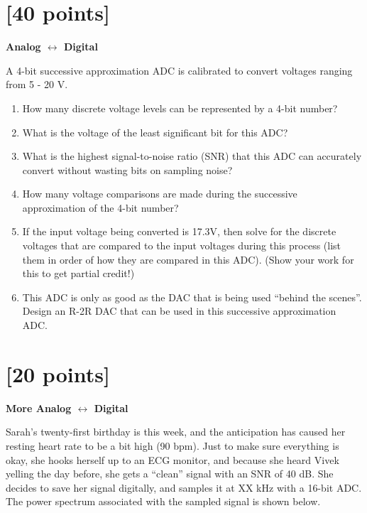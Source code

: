 \documentclass[12pt]{article}
\begin{document}
\clearpage



\clearpage



\clearpage



\section{[40 points]}

{\bf Analog $\leftrightarrow$ Digital}

A 4-bit successive approximation ADC is calibrated to convert voltages ranging from 5 - 20 V.

\begin{enumerate}
\item How many discrete voltage levels can be represented by a 4-bit number?
\item What is the voltage of the least significant bit for this ADC?
\item What is the highest signal-to-noise ratio (SNR) that this ADC can
accurately convert without wasting bits on sampling noise?
\item How many voltage comparisons are made during the successive approximation
of the 4-bit number?
\item If the input voltage being converted is 17.3V, then solve for the
discrete voltages that are compared to the input voltages during this process
(list them in order of how they are compared in this ADC).  (Show your work for
this to get partial credit!)
\item This ADC is only as good as the DAC that is being used ``behind the
scenes''.  Design an R-2R DAC that can be used in this successive approximation
ADC.
\end{enumerate}

\clearpage



\clearpage



\clearpage



\section{[20 points]}

{\bf More Analog $\leftrightarrow$ Digital}

Sarah's twenty-first birthday is this week, and the anticipation has caused her
resting heart rate to be a bit high (90 bpm).  Just to make sure everything is
okay, she hooks herself up to an ECG monitor, and because she heard Vivek
yelling the day before, she gets a ``clean'' signal with an SNR of 40 dB.  She
decides to save her signal digitally, and samples it at XX kHz with a 16-bit
ADC.  The power spectrum associated with the sampled signal is shown below.
\end{document}
